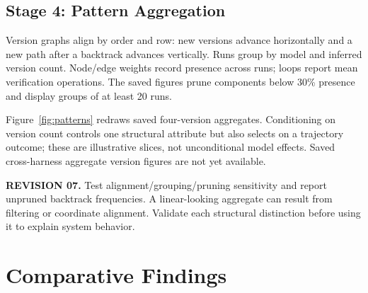 \documentclass[10pt,a4paper,twocolumn]{article}
\newcommand{\rev}[2]{\par\smallskip\noindent\begin{minipage}{\linewidth}\color{revision}\footnotesize\textbf{REVISION #1.} #2\end{minipage}\par\smallskip}
\begin{document}
\subsection{Stage 4: Pattern Aggregation}
Version graphs align by order and row: new versions advance horizontally and a new path after a backtrack advances vertically. Runs group by model and inferred version count. Node/edge weights record presence across runs; loops report mean verification operations. The saved figures prune components below 30\% presence and display groups of at least 20 runs.

Figure~\ref{fig:patterns} redraws saved four-version aggregates. Conditioning on version count controls one structural attribute but also selects on a trajectory outcome; these are illustrative slices, not unconditional model effects. Saved cross-harness aggregate version figures are not yet available.
\rev{07}{Test alignment/grouping/pruning sensitivity and report unpruned backtrack frequencies. A linear-looking aggregate can result from filtering or coordinate alignment. Validate each structural distinction before using it to explain system behavior.}

\section{Comparative Findings}
\end{document}
